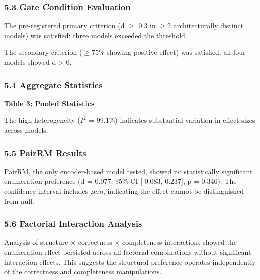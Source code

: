\subsubsection{5.3 Gate Condition Evaluation}

The pre-registered primary criterion (d $\geq$ 0.3 in $\geq 2$ architecturally distinct models) was satisfied: three models exceeded the threshold.

The secondary criterion ($\geq 75$\% showing positive effect) was satisfied: all four models showed d > 0.

\subsubsection{5.4 Aggregate Statistics}

\textbf{Table 3: Pooled Statistics}

\begin{table}[htbp]
\centering
{}
\end{table}

The high heterogeneity ($I^2$ = 99.1\%) indicates substantial variation in effect sizes across models.

\subsubsection{5.5 PairRM Results}

PairRM, the only encoder-based model tested, showed no statistically significant enumeration preference (d = 0.077, 95\% CI [-0.083, 0.237], p = 0.346). The confidence interval includes zero, indicating the effect cannot be distinguished from null.

\subsubsection{5.6 Factorial Interaction Analysis}

Analysis of structure $\times$ correctness $\times$ completeness interactions showed the enumeration effect persisted across all factorial combinations without significant interaction effects. This suggests the structural preference operates independently of the correctness and completeness manipulations.
